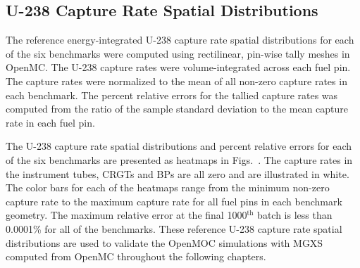 
\clearpage

\subsection{U-238 Capture Rate Spatial Distributions}
\label{subsec:chap7-capture-rates}

The reference energy-integrated U-238 capture rate spatial distributions for each of the six benchmarks were computed using rectilinear, pin-wise tally meshes in OpenMC. The U-238 capture rates were volume-integrated across each fuel pin. The capture rates were normalized to the mean of all non-zero capture rates in each benchmark. The percent relative errors for the tallied capture rates was computed from the ratio of the sample standard deviation to the mean capture rate in each fuel pin.

The U-238 capture rate spatial distributions and percent relative errors for each of the six benchmarks are presented as heatmaps in Figs.~. The capture rates in the instrument tubes, \acp{CRGT} and \acp{BP} are all zero and are illustrated in white. The color bars for each of the heatmaps range from the minimum non-zero capture rate to the maximum capture rate for all fuel pins in each benchmark geometry. The maximum relative error at the final 1000$^{\text{th}}$ batch is less than 0.0001\% for all of the benchmarks. These reference U-238 capture rate spatial distributions are used to validate the OpenMOC simulations with \ac{MGXS} computed from OpenMC throughout the following chapters.

